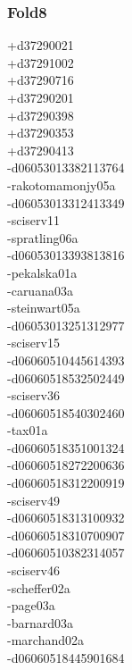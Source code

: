 \begin{multicols}{3}
\subsubsection*{Fold8}
+d37290021\\
+d37291002\\
+d37290716\\
+d37290201\\
+d37290398\\
+d37290353\\
+d37290413\\
-d06053013382113764\\
-rakotomamonjy05a\\
-d06053013312413349\\
-sciserv11\\
-spratling06a\\
-d06053013393813816\\
-pekalska01a\\
-caruana03a\\
-steinwart05a\\
-d06053013251312977\\
-sciserv15\\
-d06060510445614393\\
-d06060518532502449\\
-sciserv36\\
-d06060518540302460\\
-tax01a\\
-d06060518351001324\\
-d06060518272200636\\
-d06060518312200919\\
-sciserv49\\
-d06060518313100932\\
-d06060518310700907\\
-d06060510382314057\\
-sciserv46\\
-scheffer02a\\
-page03a\\
-barnard03a\\
-marchand02a\\
-d06060518445901684\\

\end{multicols}
